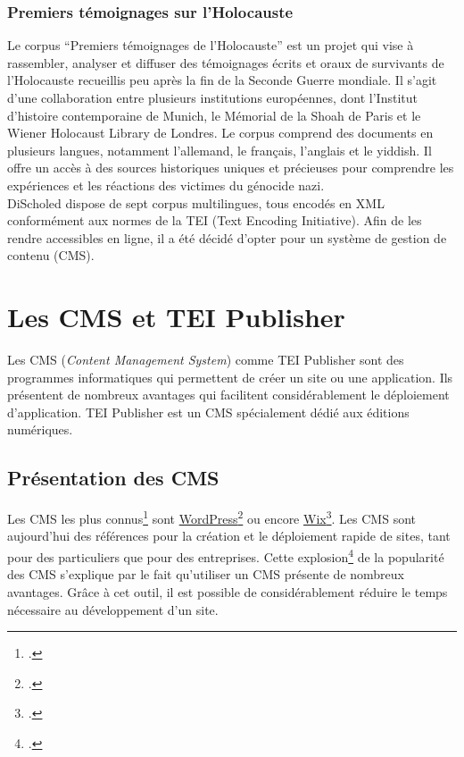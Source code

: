\subsection{Premiers témoignages sur l'Holocauste}

Le corpus “Premiers témoignages de l’Holocauste” est un projet qui vise à rassembler, analyser et diffuser des témoignages écrits et oraux de survivants de l’Holocauste recueillis peu après la fin de la Seconde Guerre mondiale. Il s’agit d’une collaboration entre plusieurs institutions européennes, dont l’Institut d’histoire contemporaine de Munich, le Mémorial de la Shoah de Paris et le Wiener Holocaust Library de Londres. Le corpus comprend des documents en plusieurs langues, notamment l’allemand, le français, l’anglais et le yiddish. Il offre un accès à des sources historiques uniques et précieuses pour comprendre les expériences et les réactions des victimes du génocide nazi. \\

DiScholed dispose de sept corpus multilingues, tous encodés en XML conformément aux normes de la TEI (Text Encoding Initiative). Afin de les rendre accessibles en ligne, il a été décidé d'opter pour un système de gestion de contenu (CMS).

\chapter{Les CMS et TEI Publisher}

Les CMS (\textit{Content Management System}) comme TEI Publisher sont des programmes informatiques qui permettent de créer un site ou une application. Ils présentent de nombreux avantages qui facilitent considérablement le déploiement d'application. TEI Publisher est un CMS spécialement dédié aux éditions numériques. 

\section{Présentation des CMS}

Les CMS les plus connus\footcite{MeilleurCMS2023} sont \href{https://fr.wordpress.org/}{WordPress\footcite{WordPress}} ou encore \href{https://fr.wix.com/}{Wix\footcite{Wix}}. Les CMS sont aujourd'hui des références pour la création et le déploiement rapide de sites, tant pour des particuliers que pour des entreprises. 
Cette explosion\footcite{CMSOpenSource} de la popularité des CMS s'explique par le fait qu'utiliser un CMS présente de nombreux avantages. Grâce à cet outil, il est possible de considérablement réduire le temps nécessaire au développement d'un site.


